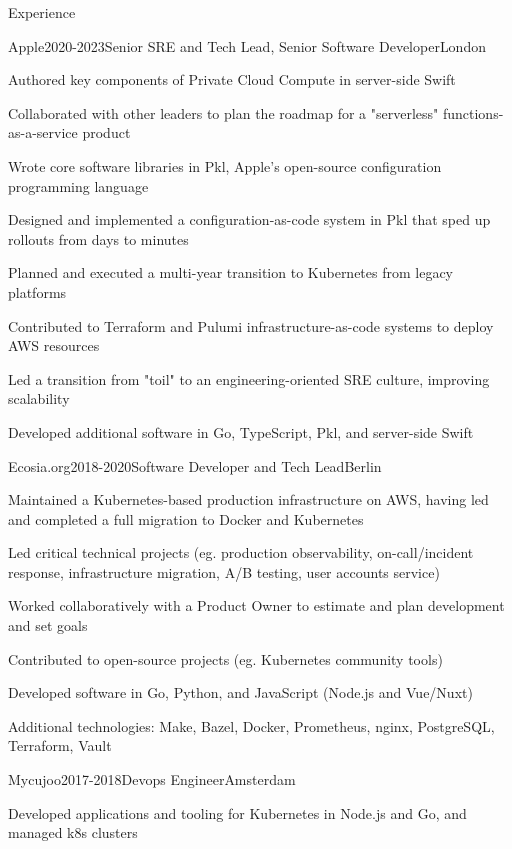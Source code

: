 \documentclass{resume} %
\begin{document}
\begin{rSection}{Experience}
\begin{rSubsection}{{Apple}}{2020-2023}{Senior SRE and Tech Lead, Senior Software Developer}{London}
    \item Authored key components of Private Cloud Compute in server-side Swift
    \item Collaborated with other leaders to plan the roadmap for a "serverless" functions-as-a-service product
    \item Wrote core software libraries in Pkl, Apple's open-source configuration programming language
    \item Designed and implemented a configuration-as-code system in Pkl that sped up rollouts from days to minutes
    \item Planned and executed a multi-year transition to Kubernetes from legacy platforms
    \item Contributed to Terraform and Pulumi infrastructure-as-code systems to deploy AWS resources
    \item Led a transition from "toil" to an engineering-oriented SRE culture, improving scalability
    \item Developed additional software in Go, TypeScript, Pkl, and server-side Swift
\end{rSubsection}

\begin{rSubsection}{{Ecosia.org}}{2018-2020}{Software Developer and Tech Lead}{Berlin}
    \item Maintained a Kubernetes-based production infrastructure on AWS, having led and completed a full migration to Docker and Kubernetes
    \item Led critical technical projects (eg. production observability, on-call/incident response, infrastructure migration, A/B testing, user accounts service)
    \item Worked collaboratively with a Product Owner to estimate and plan development and set goals
    \item Contributed to open-source projects (eg. Kubernetes community tools)
    \item Developed software in Go, Python, and JavaScript (Node.js and Vue/Nuxt)
    \item Additional technologies: Make, Bazel, Docker, Prometheus, nginx, PostgreSQL, Terraform, Vault
\end{rSubsection}

\begin{rSubsection}{{Mycujoo}}{2017-2018}{Devops Engineer}{Amsterdam}
    \item Developed applications and tooling for Kubernetes in Node.js and Go, and managed k8s clusters
\end{rSubsection}


\end{rSection}
\end{document}
